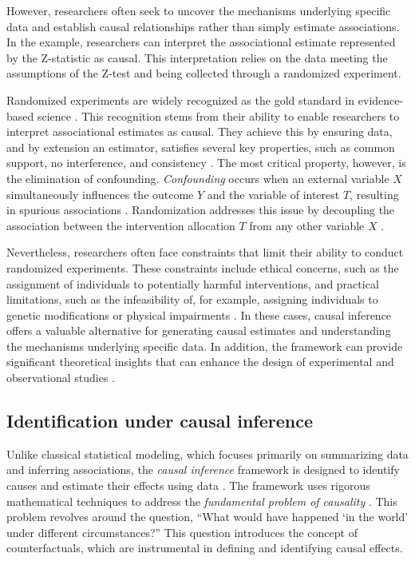 \documentclass[
  authoryear,
  review,
  1p]{elsarticle}
\begin{document}
However, researchers often seek to uncover the mechanisms underlying
specific data and establish causal relationships rather than simply
estimate associations. In the example, researchers can interpret the
associational estimate represented by the Z-statistic as causal. This
interpretation relies on the data meeting the assumptions of the Z-test
and being collected through a randomized experiment.

Randomized experiments are widely recognized as the gold standard in
evidence-based science \citep{Hariton_et_al_2018, Hansson_2014}. This
recognition stems from their ability to enable researchers to interpret
associational estimates as causal. They achieve this by ensuring data,
and by extension an estimator, satisfies several key properties, such as
common support, no interference, and consistency
\citep{Morgan_et_al_2014, Neal_2020}. The most critical property,
however, is the elimination of confounding. \emph{Confounding} occurs
when an external variable \(X\) simultaneously influences the outcome
\(Y\) and the variable of interest \(T\), resulting in spurious
associations \citep{Everitt_et_al_2010}. Randomization addresses this
issue by decoupling the association between the intervention allocation
\(T\) from any other variable \(X\)
\citep{Morgan_et_al_2014, Neal_2020}.

Nevertheless, researchers often face constraints that limit their
ability to conduct randomized experiments. These constraints include
ethical concerns, such as the assignment of individuals to potentially
harmful interventions, and practical limitations, such as the
infeasibility of, for example, assigning individuals to genetic
modifications or physical impairments \citep{Neal_2020}. In these cases,
causal inference offers a valuable alternative for generating causal
estimates and understanding the mechanisms underlying specific data. In
addition, the framework can provide significant theoretical insights
that can enhance the design of experimental and observational studies
\citep{McElreath_2020}.

\subsection{Identification under causal inference}\label{sec-appendix-B}

Unlike classical statistical modeling, which focuses primarily on
summarizing data and inferring associations, the \emph{causal inference}
framework is designed to identify causes and estimate their effects
using data \citep{Shaughnessy_et_al_2010, Neal_2020}. The framework uses
rigorous mathematical techniques to address the \emph{fundamental
problem of causality}
\citep{Pearl_2009, Pearl_et_al_2016, Morgan_et_al_2014}. This problem
revolves around the question, ``What would have happened `in the world'
under different circumstances?'' This question introduces the concept of
counterfactuals, which are instrumental in defining and identifying
causal effects.
\end{document}

